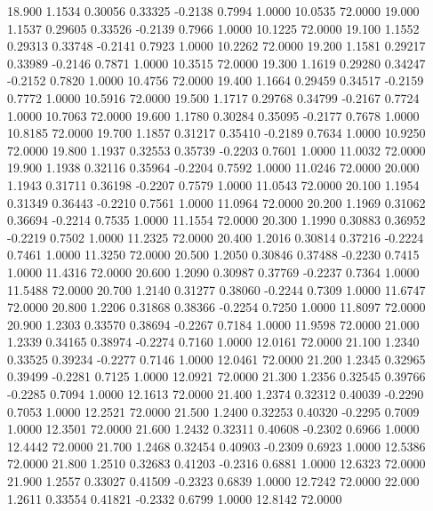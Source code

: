   18.900   1.1534   0.30056   0.33325  -0.2138   0.7994   1.0000  10.0535  72.0000
  19.000   1.1537   0.29605   0.33526  -0.2139   0.7966   1.0000  10.1225  72.0000
  19.100   1.1552   0.29313   0.33748  -0.2141   0.7923   1.0000  10.2262  72.0000
  19.200   1.1581   0.29217   0.33989  -0.2146   0.7871   1.0000  10.3515  72.0000
  19.300   1.1619   0.29280   0.34247  -0.2152   0.7820   1.0000  10.4756  72.0000
  19.400   1.1664   0.29459   0.34517  -0.2159   0.7772   1.0000  10.5916  72.0000
  19.500   1.1717   0.29768   0.34799  -0.2167   0.7724   1.0000  10.7063  72.0000
  19.600   1.1780   0.30284   0.35095  -0.2177   0.7678   1.0000  10.8185  72.0000
  19.700   1.1857   0.31217   0.35410  -0.2189   0.7634   1.0000  10.9250  72.0000
  19.800   1.1937   0.32553   0.35739  -0.2203   0.7601   1.0000  11.0032  72.0000
  19.900   1.1938   0.32116   0.35964  -0.2204   0.7592   1.0000  11.0246  72.0000
  20.000   1.1943   0.31711   0.36198  -0.2207   0.7579   1.0000  11.0543  72.0000
  20.100   1.1954   0.31349   0.36443  -0.2210   0.7561   1.0000  11.0964  72.0000
  20.200   1.1969   0.31062   0.36694  -0.2214   0.7535   1.0000  11.1554  72.0000
  20.300   1.1990   0.30883   0.36952  -0.2219   0.7502   1.0000  11.2325  72.0000
  20.400   1.2016   0.30814   0.37216  -0.2224   0.7461   1.0000  11.3250  72.0000
  20.500   1.2050   0.30846   0.37488  -0.2230   0.7415   1.0000  11.4316  72.0000
  20.600   1.2090   0.30987   0.37769  -0.2237   0.7364   1.0000  11.5488  72.0000
  20.700   1.2140   0.31277   0.38060  -0.2244   0.7309   1.0000  11.6747  72.0000
  20.800   1.2206   0.31868   0.38366  -0.2254   0.7250   1.0000  11.8097  72.0000
  20.900   1.2303   0.33570   0.38694  -0.2267   0.7184   1.0000  11.9598  72.0000
  21.000   1.2339   0.34165   0.38974  -0.2274   0.7160   1.0000  12.0161  72.0000
  21.100   1.2340   0.33525   0.39234  -0.2277   0.7146   1.0000  12.0461  72.0000
  21.200   1.2345   0.32965   0.39499  -0.2281   0.7125   1.0000  12.0921  72.0000
  21.300   1.2356   0.32545   0.39766  -0.2285   0.7094   1.0000  12.1613  72.0000
  21.400   1.2374   0.32312   0.40039  -0.2290   0.7053   1.0000  12.2521  72.0000
  21.500   1.2400   0.32253   0.40320  -0.2295   0.7009   1.0000  12.3501  72.0000
  21.600   1.2432   0.32311   0.40608  -0.2302   0.6966   1.0000  12.4442  72.0000
  21.700   1.2468   0.32454   0.40903  -0.2309   0.6923   1.0000  12.5386  72.0000
  21.800   1.2510   0.32683   0.41203  -0.2316   0.6881   1.0000  12.6323  72.0000
  21.900   1.2557   0.33027   0.41509  -0.2323   0.6839   1.0000  12.7242  72.0000
  22.000   1.2611   0.33554   0.41821  -0.2332   0.6799   1.0000  12.8142  72.0000
